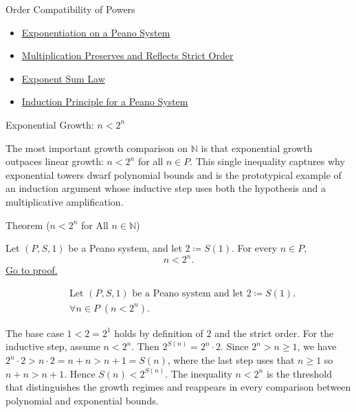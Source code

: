 \begin{topicbox}{Order Compatibility of Powers}
\begin{dependencies}
\begin{itemize}
  \item \hyperref[def:exponentiation-on-peano-system]{Exponentiation on a Peano System}
  \item \hyperref[thm:multiplication-preserves-and-reflects-strict-order]{Multiplication Preserves and Reflects Strict Order}
  \item \hyperref[thm:exponent-sum-law]{Exponent Sum Law}
  \item \hyperref[thm:induction-principle-for-peano-system]{Induction Principle for a Peano System}
\end{itemize}
\end{dependencies}
\end{topicbox}

\begin{topicbox}{Exponential Growth: $n < 2^n$}
\begin{exposition}
The most important growth comparison on $\mathbb{N}$ is that exponential
growth outpaces linear growth: $n < 2^n$ for all $n \in P$. This single
inequality captures why exponential towers dwarf polynomial bounds and is
the prototypical example of an induction argument whose inductive step uses
both the hypothesis and a multiplicative amplification.
\end{exposition}

\begin{theorembox}{Theorem ($n < 2^n$ for All $n \in \mathbb{N}$)}
\begin{theorem}
\label{thm:n-less-than-2-to-n}
Let $(P,S,1)$ be a Peano system, and let $2 \coloneqq S(1)$. For every $n \in P$,
\[
n < 2^n.
\]
\hyperref[prf:n-less-than-2-to-n]{Go to proof.}
\end{theorem}
\end{theorembox}

\begin{remark*}
\[
\begin{aligned}
&\text{Let } (P,S,1) \text{ be a Peano system and let } 2 \coloneqq S(1).\\
&\forall n \in P\;(n < 2^n).
\end{aligned}
\]
\end{remark*}

\begin{remark*}[Interpretation]
The base case $1 < 2 = 2^1$ holds by definition of $2$ and the strict order.
For the inductive step, assume $n < 2^n$. Then $2^{S(n)} = 2^n \cdot 2$.
Since $2^n > n \ge 1$, we have $2^n \cdot 2 > n \cdot 2 = n + n > n + 1 = S(n)$,
where the last step uses that $n \ge 1$ so $n + n > n + 1$. Hence $S(n) < 2^{S(n)}$.
The inequality $n < 2^n$ is the threshold that distinguishes the growth regimes
and reappears in every comparison between polynomial and exponential bounds.
\end{remark*}


\end{topicbox}
